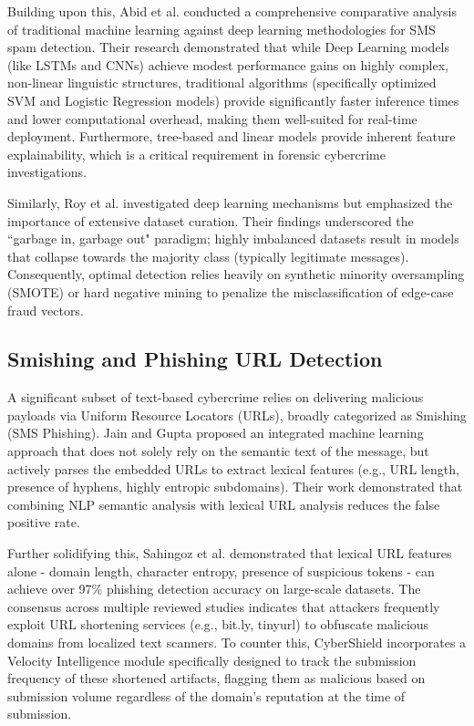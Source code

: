 Building upon this, Abid et al. \cite{abid2022spam} conducted a comprehensive comparative analysis of traditional machine learning against deep learning methodologies for SMS spam detection. Their research demonstrated that while Deep Learning models (like LSTMs and CNNs) achieve modest performance gains on highly complex, non-linear linguistic structures, traditional algorithms (specifically optimized SVM and Logistic Regression models) provide significantly faster inference times and lower computational overhead, making them well-suited for real-time deployment. Furthermore, tree-based and linear models provide inherent feature explainability, which is a critical requirement in forensic cybercrime investigations.

Similarly, Roy et al. \cite{roy2020deep} investigated deep learning mechanisms but emphasized the importance of extensive dataset curation. Their findings underscored the ``garbage in, garbage out" paradigm; highly imbalanced datasets result in models that collapse towards the majority class (typically legitimate messages). Consequently, optimal detection relies heavily on synthetic minority oversampling (SMOTE) or hard negative mining to penalize the misclassification of edge-case fraud vectors.

\subsection{Smishing and Phishing URL Detection}
A significant subset of text-based cybercrime relies on delivering malicious payloads via Uniform Resource Locators (URLs), broadly categorized as Smishing (SMS Phishing). Jain and Gupta \cite{jain2021smishing} proposed an integrated machine learning approach that does not solely rely on the semantic text of the message, but actively parses the embedded URLs to extract lexical features (e.g., URL length, presence of hyphens, highly entropic subdomains). Their work demonstrated that combining NLP semantic analysis with lexical URL analysis reduces the false positive rate.

Further solidifying this, Sahingoz et al. \cite{sahingoz2019machine} demonstrated that lexical URL features alone - domain length, character entropy, presence of suspicious tokens - can achieve over 97\% phishing detection accuracy on large-scale datasets. The consensus across multiple reviewed studies indicates that attackers frequently exploit URL shortening services (e.g., bit.ly, tinyurl) to obfuscate malicious domains from localized text scanners. To counter this, CyberShield incorporates a Velocity Intelligence module specifically designed to track the submission frequency of these shortened artifacts, flagging them as malicious based on submission volume regardless of the domain's reputation at the time of submission.

